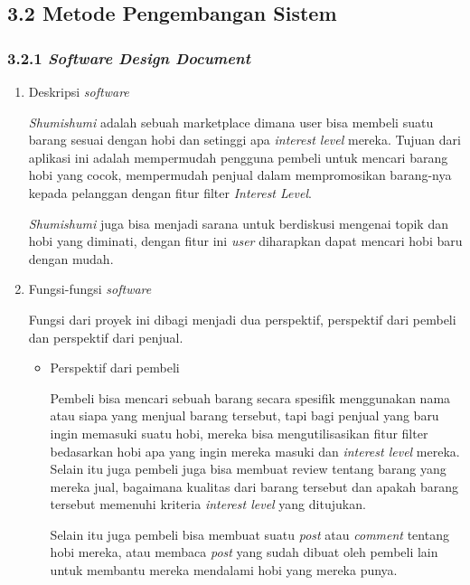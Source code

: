\documentclass[a4paper]{article}
\begin{document}
\subsection*{3.2 Metode Pengembangan Sistem}

\subsubsection*{3.2.1 \textit{Software Design Document}}
\begin{enumerate}[label=\alph*. ]
    \item Deskripsi \textit{software}

          \textit{Shumishumi} adalah sebuah marketplace dimana user bisa membeli suatu barang sesuai dengan hobi dan setinggi apa \textit{interest level} mereka. Tujuan dari aplikasi ini adalah mempermudah pengguna pembeli untuk mencari barang hobi yang cocok, mempermudah penjual dalam mempromosikan barang-nya kepada pelanggan dengan fitur filter \textit{Interest Level}.


          \textit{Shumishumi} juga bisa menjadi sarana untuk berdiskusi mengenai topik dan hobi yang diminati, dengan fitur ini \textit{user} diharapkan dapat mencari hobi baru dengan mudah.

    \item Fungsi-fungsi \textit{software}


          Fungsi dari proyek ini dibagi menjadi dua perspektif, perspektif dari pembeli dan perspektif dari penjual.
          \begin{itemize}
              \item Perspektif dari pembeli

                    Pembeli bisa mencari sebuah barang secara spesifik menggunakan nama atau siapa yang menjual barang tersebut, tapi bagi penjual yang baru ingin memasuki suatu hobi, mereka bisa mengutilisasikan fitur filter bedasarkan hobi apa yang ingin mereka masuki dan \textit{interest level} mereka. Selain itu juga pembeli juga bisa membuat review tentang barang yang mereka jual, bagaimana kualitas dari barang tersebut dan apakah barang tersebut memenuhi kriteria \textit{interest level} yang ditujukan.

                    Selain itu juga pembeli bisa membuat suatu \textit{post} atau \textit{comment} tentang hobi mereka, atau membaca \textit{post} yang sudah dibuat oleh pembeli lain untuk membantu mereka mendalami hobi yang mereka punya.


\end{itemize}
\end{enumerate}
\end{document}

